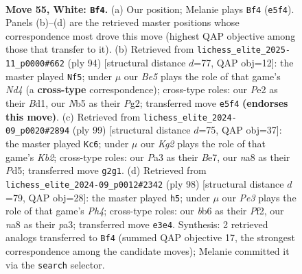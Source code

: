 \documentclass[11pt]{article}
\begin{document}
\clearpage

\begin{figure}[p]\centering
\begin{subfigure}{0.46\textwidth}\centering
\resizebox{\linewidth}{!}{%
\newchessgame
\chessboard[
  setfen={n7/1p1n3k/1b6/pN1pB3/6bp/PP2P3/4P1K1/3B4 w - - 6 55},
  showmover=false,
  pgfstyle=straightmove, color=movearrow, markmove={e5-f4}
]}
\caption{}
\end{subfigure}\hfill
\begin{subfigure}{0.46\textwidth}\centering
\resizebox{\linewidth}{!}{%
\newchessgame
\chessboard[
  setfen={8/3k4/1p3n2/4b1p1/1PPNp1P1/8/6P1/3B1K2 w - - 3 48},
  showmover=false,
  pgfstyle=straightmove, color=movearrow, markmove={d4-f5}
]}
\caption{}
\end{subfigure}
\\[4pt]
\begin{subfigure}{0.46\textwidth}\centering
\resizebox{\linewidth}{!}{%
\newchessgame
\chessboard[
  setfen={8/1k2b1p1/4p3/3pP3/2bP2P1/1p4K1/2n2B2/1R1N4 b - - 7 50},
  showmover=false,
  pgfstyle=straightmove, color=movearrow, markmove={b7-c6}
]}
\caption{}
\end{subfigure}\hfill
\begin{subfigure}{0.46\textwidth}\centering
\resizebox{\linewidth}{!}{%
\newchessgame
\chessboard[
  setfen={8/5p2/8/kp4P1/7P/pP1NP3/bbB2P2/6K1 w - - 3 50},
  showmover=false,
  pgfstyle=straightmove, color=movearrow, markmove={h4-h5}
]}
\caption{}
\end{subfigure}
\caption{\textbf{Move 55, White: \texttt{Bf4}.} (a) Our position; Melanie plays \texttt{Bf4} (\texttt{e5f4}). Panels (b)--(d) are the retrieved master positions whose correspondence most drove this move (highest QAP objective among those that transfer to it). (b) Retrieved from \texttt{lichess\_elite\_2025-11\_p0000\#662} (ply 94) [structural distance $d$=77, QAP obj=12]: the master played \texttt{Nf5}; under $\mu$ our \emph{Be5} plays the role of that game's \emph{Nd4} (a \textbf{cross-type} correspondence); cross-type roles: our \emph{P}e2 as their \emph{B}d1, our \emph{N}b5 as their \emph{P}g2; transferred move \texttt{e5f4} \textbf{(endorses this move)}. (c) Retrieved from \texttt{lichess\_elite\_2024-09\_p0020\#2894} (ply 99) [structural distance $d$=75, QAP obj=37]: the master played \texttt{Kc6}; under $\mu$ our \emph{Kg2} plays the role of that game's \emph{Kb2}; cross-type roles: our \emph{P}a3 as their \emph{B}e7, our \emph{n}a8 as their \emph{P}d5; transferred move \texttt{g2g1}. (d) Retrieved from \texttt{lichess\_elite\_2024-09\_p0012\#2342} (ply 98) [structural distance $d$=79, QAP obj=28]: the master played \texttt{h5}; under $\mu$ our \emph{Pe3} plays the role of that game's \emph{Ph4}; cross-type roles: our \emph{b}b6 as their \emph{P}f2, our \emph{n}a8 as their \emph{p}a3; transferred move \texttt{e3e4}. Synthesis: 2 retrieved analogs transferred to \texttt{Bf4} (summed QAP objective 17, the strongest correspondence among the candidate moves); Melanie committed it via the \texttt{search} selector.}
\label{fig:thought-m108}
\end{figure}
\end{document}
